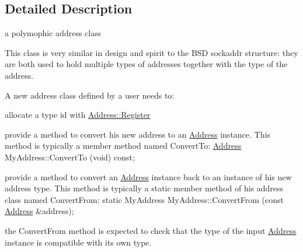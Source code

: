 \subsection{Detailed Description}
a polymophic address class 

This class is very similar in design and spirit to the B\+SD sockaddr structure\+: they are both used to hold multiple types of addresses together with the type of the address.

A new address class defined by a user needs to\+:
\begin{DoxyItemize}
\item allocate a type id with \hyperlink{classns3_1_1Address_a75d239c79bb3c39d64a8db4f2d3d9b20}{Address\+::\+Register}
\item provide a method to convert his new address to an \hyperlink{classns3_1_1Address}{Address} instance. This method is typically a member method named Convert\+To\+: \hyperlink{classns3_1_1Address}{Address} My\+Address\+::\+Convert\+To (void) const;
\item provide a method to convert an \hyperlink{classns3_1_1Address}{Address} instance back to an instance of his new address type. This method is typically a static member method of his address class named Convert\+From\+: static My\+Address My\+Address\+::\+Convert\+From (const \hyperlink{classns3_1_1Address}{Address} \&address);
\item the Convert\+From method is expected to check that the type of the input \hyperlink{classns3_1_1Address}{Address} instance is compatible with its own type.
\end{DoxyItemize}

